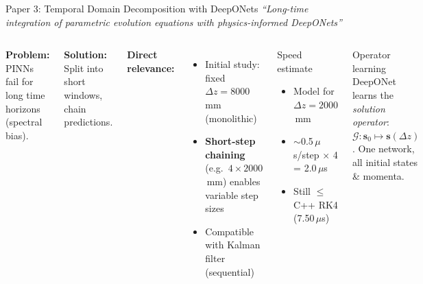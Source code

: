 \documentclass[aspectratio=169, 11pt]{beamer}
\newcommand{\vb}[1]{\bm{#1}}
\begin{document}
\begin{frame}{Paper 3: Temporal Domain Decomposition with DeepONets}
  \textit{``Long-time integration of parametric evolution equations with physics-informed DeepONets''}

  \begin{columns}[T]
    \textbf{Problem:} PINNs fail for long time horizons (spectral bias).

    \textbf{Solution:} Split into short windows, chain predictions.

    \textbf{Direct relevance:}
    \begin{itemize}\setlength{\itemsep}{1pt}
      \item Initial study: fixed $\Delta z = 8000$\,mm (monolithic)
      \item \textbf{Short-step chaining} (e.g.\ $4 \times 2000$\,mm) enables variable step sizes
      \item Compatible with Kalman filter (sequential)
    \end{itemize}

    \begin{exampleblock}{Speed estimate}
      \begin{itemize}\setlength{\itemsep}{1pt}
        \item Model for $\Delta z = 2000$\,mm
        \item $\sim$0.5\,$\mu$s/step $\times$ 4 = 2.0\,$\mu$s
        \item Still $\leq$ C++ RK4 (7.50\,$\mu$s)
      \end{itemize}
    \end{exampleblock}

    \begin{block}{Operator learning}
      DeepONet learns the \emph{solution operator}:
      $\mathcal{G}: \vb{s}_0 \mapsto \vb{s}(\Delta z)$.
      One network, all initial states \& momenta.
    \end{block}
  \end{columns}
\end{frame}
\end{document}
